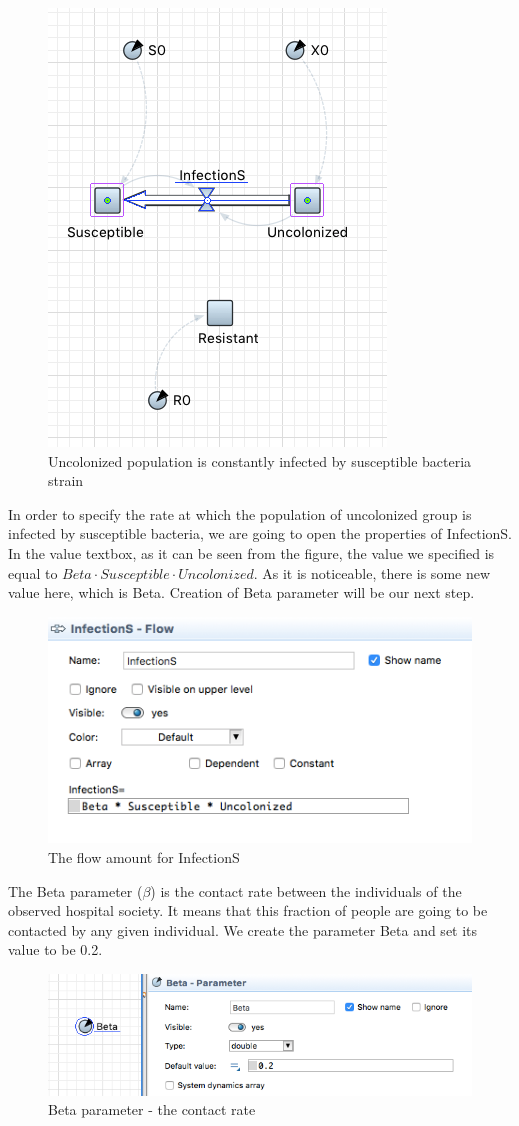 \begin{figure}[H]
  \centering
  \includegraphics[height=0.6\textwidth]{img/screens/basic/basic13}
  \caption{Uncolonized population is constantly infected by susceptible bacteria strain}
\end{figure}

In order to specify the rate at which the population of uncolonized group is infected by susceptible bacteria, we are going to open the properties of InfectionS. In the value textbox, as it can be seen from the figure, the value we specified is equal to $Beta \cdot Susceptible \cdot Uncolonized$. As it is noticeable, there is some new value here, which is Beta. Creation of Beta parameter will be our next step.

\begin{figure}[H]
  \centering
  \includegraphics[height=0.3\textwidth]{img/screens/basic/basic12}
  \caption{The flow amount for InfectionS}
\end{figure}

The Beta parameter ($\beta$) is the contact rate between the individuals of the observed hospital society. It means that this fraction of people are going to be contacted by any given individual. We create the parameter Beta and set its value to be 0.2.

\begin{figure}[H]
  \centering
  \includegraphics[height=0.25\textwidth]{img/screens/basic/basic14}
  \caption{Beta parameter - the contact rate}
\end{figure}

